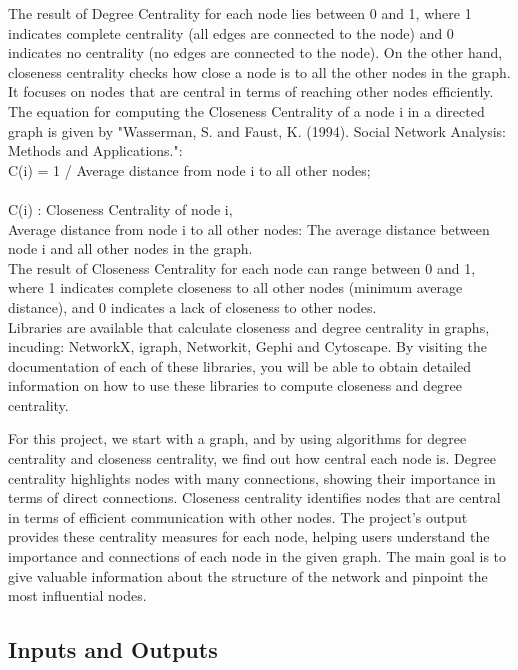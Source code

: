 \documentclass{article}
\begin{document}
The result of Degree Centrality for each node lies between 0 and 1, where 1 indicates complete centrality (all edges are connected to the node) and 0 indicates no centrality (no edges are connected to the node).
On the other hand, closeness centrality checks how close a node is to all the other nodes in the graph. It focuses on nodes that are central in terms of reaching other nodes efficiently. The equation for computing the Closeness Centrality of a node 
i in a directed graph is given by "Wasserman, S. and Faust, K. (1994). Social Network Analysis: Methods and Applications.":\\

C(i) = 1 / Average distance from node i to all other nodes;\\
\\
C(i) : Closeness Centrality of node i,\\
Average distance from node i to all other nodes: The average distance between node i and all other nodes in the graph.\\

The result of Closeness Centrality for each node can range between 0 and 1, where 1 indicates complete closeness to all other nodes (minimum average distance), and 0 indicates a lack of closeness to other nodes.\\

Libraries are available that calculate closeness and degree centrality in graphs, incuding: NetworkX, igraph, Networkit, Gephi and Cytoscape. By visiting the documentation of each of these libraries, you will be able to obtain detailed information on how to use these libraries to compute closeness and degree centrality.

For this project, we start with a graph, and by using algorithms for degree centrality and closeness centrality, we find out how central each node is. Degree centrality highlights nodes with many connections, showing their importance in terms of direct connections. Closeness centrality identifies nodes that are central in terms of efficient communication with other nodes. The project's output provides these centrality measures for each node, helping users understand the importance and connections of each node in the given graph. The main goal is to give valuable information about the structure of the network and pinpoint the most influential nodes.

\subsection{Inputs and Outputs}
\end{document}
